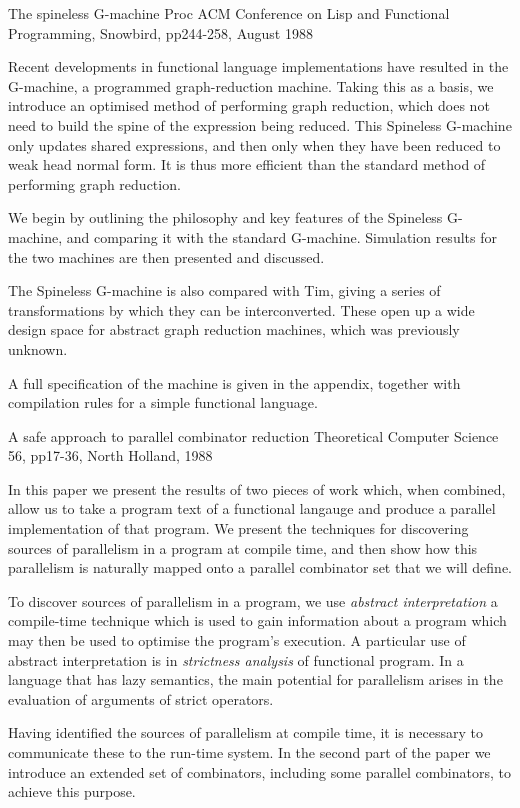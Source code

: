 {The spineless G-machine}
{Proc ACM Conference on Lisp and Functional Programming, Snowbird, pp244-258,
August 1988}
{
Recent developments in functional language implementations have
resulted in the G-machine, a programmed graph-reduction machine.
Taking this as a basis, we introduce an optimised method of
performing graph reduction, which does not need to build the
spine of the expression being reduced.
This Spineless G-machine only updates shared expressions, and
then only when they have been reduced to weak head normal form.
It is thus more efficient than the standard method of performing
graph reduction.

We begin by outlining the philosophy and key features of the
Spineless G-machine, and comparing it with the standard
G-machine.
Simulation results for the two machines are then presented and
discussed.

The Spineless G-machine is also compared with Tim, giving a
series of transformations by which they can be interconverted.
These open up a wide design space for abstract graph reduction
machines, which was previously unknown.

A full specification of the machine is given in the appendix,
together with compilation rules for a simple functional language.
}

{A safe approach to parallel combinator reduction}
{Theoretical Computer Science 56, pp17-36, North Holland, 1988}
{
In this paper we present the results of two pieces of work which, when
combined, allow us to take a program text of a functional langauge and
produce a parallel implementation of that program.
We present the techniques for discovering sources of parallelism in 
a program at compile time, and then show how this parallelism is
naturally mapped onto a parallel combinator set that we will define.

To discover sources of parallelism in a program, we use 
{\em abstract interpretation} a compile-time technique which is used
to gain information about a program which may then be used to optimise
the program's execution.
A particular use of abstract interpretation is in 
{\em strictness analysis}
of functional program.
In a language that has lazy semantics, the main potential for parallelism
arises in the evaluation of arguments of strict operators.

Having identified the sources of parallelism at compile time, it is 
necessary to communicate these to the run-time system.
In the second part of the paper we introduce an extended set of combinators,
including some parallel combinators, to achieve this purpose.
}


